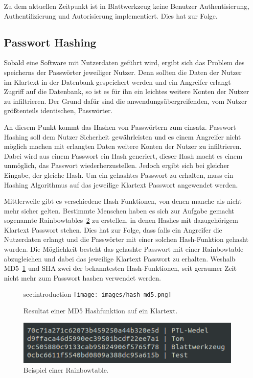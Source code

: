 \documentclass[11pt]{article}
\newcommand{\hlnote}[2]{#1}
\newcommand{\hlnote}[2]{\todo{#2}\texthl{#1}}
\begin{document}
	Zu dem aktuellen Zeitpunkt ist in Blattwerkzeug keine Benutzer Authentisierung, Authentifizierung und Autorisierung implementiert. Dies hat zur Folge.
	
	\subsection{Passwort Hashing}
	\label{sec:password_hashing}
	
	Sobald eine Software mit Nutzerdaten geführt wird, ergibt sich das Problem des speicherns der Passwörter jeweiliger Nutzer.
	Denn sollten die Daten der Nutzer im Klartext in der Datenbank gespeichert werden und ein Angreifer erlangt Zugriff auf die Datenbank, so ist es für ihn ein leichtes weitere Konten der Nutzer zu infiltrieren. Der Grund dafür sind die anwendungsübergreifenden, vom Nutzer größtenteils identischen, Passwörter.
	
	An diesem Punkt kommt das Hashen von Passwörtern zum einsatz. Passwort Hashing soll dem Nutzer Sicherheit gewährleisten und es einem Angreifer nicht möglich machen mit erlangten Daten weitere Konten der Nutzer zu infiltrieren. Dabei wird aus einem Passwort ein Hash generiert, dieser Hash macht es einem unmöglich, das Passwort wiederherzustellen. Jedoch ergibt sich bei gleicher Eingabe, der gleiche Hash. Um ein gehashtes Passwort zu erhalten, muss ein Hashing Algorithmus auf das jeweilige Klartext Passwort angewendet werden.
	
	Mittlerweile gibt es verschiedene Hash-Funktionen, von denen manche als nicht mehr sicher gelten. \hlnote{Bestimmte}{Weasel} Menschen haben es sich zur Aufgabe gemacht sogenannte Rainbowtables~\ref{fig:rainbowtable} zu erstellen, in denen Hashes mit dazugehörigem Klartext Passwort stehen. Dies hat zur Folge, dass falls ein Angreifer die Nutzerdaten erlangt und die Passwörter mit einer solchen Hash-Funktion gehasht wurden. Die Möglichkeit besteht das gehashte Passwort mit einer Rainbowtable abzugleichen und dabei das jeweilige Klartext Passwort zu erhalten. Weshalb MD5~\ref{fig:md5} und SHA zwei der bekanntesten Hash-Funktionen, seit geraumer Zeit nicht mehr zum Passwort hashen verwendet werden.
	
	\begin{figure}[h]
sec:introduction		\texttt{[image: images/hash-md5.png]}
		\caption{Resultat einer MD5 Hashfunktion auf ein Klartext.}
		\label{fig:md5}
	\end{figure}

	\begin{figure}[h]
		\includegraphics[width=\textwidth]{images/rainbowtable.png}
		\caption{Beispiel einer Rainbowtable.}
		\label{fig:rainbowtable}
	\end{figure}
	
\end{document}
